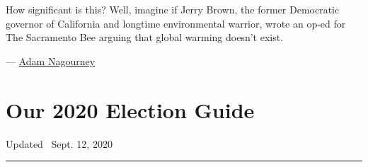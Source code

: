 How significant is this? Well, imagine if Jerry Brown, the former
Democratic governor of California and longtime environmental warrior,
wrote an op-ed for The Sacramento Bee arguing that global warming
doesn't exist.

--- \href{https://www.nytimes3xbfgragh.onion/by/adam-nagourney}{Adam
Nagourney}

\hypertarget{our-2020-election-guide}{%
\section{Our 2020 Election Guide}\label{our-2020-election-guide}}

Updated ~Sept. 12, 2020

\begin{center}\rule{0.5\linewidth}{\linethickness}\end{center}

